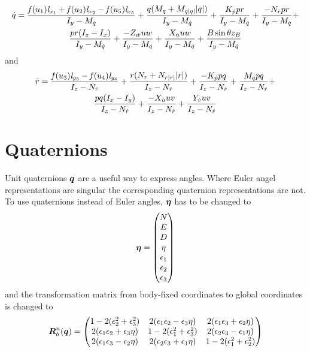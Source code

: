 \begin{multline} \label{eq:q_dot}
\dot{q} =\frac{\mathit{f}(u_{1}) \mathit{l}_{x_{1}} + \mathit{f}(u_{2}) \mathit{l}_{x_{2}} - \mathit{f}(u_{5}) \mathit{l}_{x_{5}}}{I_{y} - M_{\dot{q}}} + \frac{q (M_{q} + M_{q|q|} |q|)}{I_{y} - M_{\dot{q}}} + \frac{K_{\dot{p}} p r}{I_{y} - M_{\dot{q}}} + \frac{-N_{\dot{r}} p r}{I_{y} - M_{\dot{q}}} +\\
\frac{p r (I_{z} - I_{x})}{I_{y} - M_{\dot{q}}} + \frac{-Z_{\dot{w}} u w}{I_{y} - M_{\dot{q}}} + \frac{X_{\dot{u}} u w}{I_{y} - M_{\dot{q}}} + \frac{B \sin{\theta} z_B}{I_{y} - M_{\dot{q}}} 
\end{multline} and 
\begin{multline} \label{eq:r_dot}
\dot{r} = \frac{\mathit{f}(u_{3}) \mathit{l}_{y_{3}} - \mathit{f}(u_{4}) \mathit{l}_{y_{4}}}{I_{z} - N_{\dot{r}}} + \frac{r (N_{r} + N_{r|r|} |r|)}{I_{z} - N_{\dot{r}}} + \frac{-K_{\dot{p}} p q}{I_{z} - N_{\dot{r}}} + \frac{M_{\dot{q}} p q}{I_{z} - N_{\dot{r}}} +\\
\frac{p q (I_{x} - I_{y})}{I_{z} - N_{\dot{r}}} + \frac{- X_{\dot{u}} u v}{I_{z} - N_{\dot{r}}} + \frac{Y_{\dot{v}} u v}{I_{z} - N_{\dot{r}}}
\end{multline} 

\section{Quaternions}  
Unit quaternions $\boldsymbol{q}$ are a useful way to express angles. Where Euler angel representations are singular the corresponding quaternion representations are not. To use quaternions instead of Euler angles, $\boldsymbol{\eta}$ has to be changed to 
\begin{equation}
\boldsymbol{\eta} = \begin{pmatrix}
N \\
E \\
D \\
\eta \\
\epsilon_1 \\
\epsilon_2 \\
\epsilon_3 \\
\end{pmatrix}
\end{equation}
and the transformation matrix from body-fixed coordinates to global coordinates is changed to 
\begin{equation}
\boldsymbol{R}^n_b(\boldsymbol{q}) = \begin{pmatrix}
  1 - 2(\epsilon_2^2 + \epsilon_3^2) & 2(\epsilon_1\epsilon_2 - \epsilon_3\eta)   & 2(\epsilon_1\epsilon_3 + \epsilon_2\eta) \\
     2(\epsilon_1\epsilon_2 + \epsilon_3\eta) &  1-2(\epsilon_1^2 + \epsilon_3^2) & 2(\epsilon_2\epsilon_3-\epsilon_1\eta)    \\
     2(\epsilon_1\epsilon_3 - \epsilon_2\eta) &  2(\epsilon_2\epsilon_3 + \epsilon_1\eta)  & 1-2(\epsilon_1^2 + \epsilon_2^2) \\
\end{pmatrix}
\end{equation}

